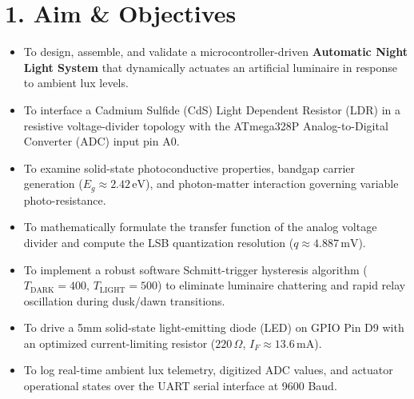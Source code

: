 \documentclass[10pt,a4paper]{article}
\begin{document}
\section*{1. Aim \& Objectives}
\begin{itemize}[noitemsep]
    \item To design, assemble, and validate a microcontroller-driven \textbf{Automatic Night Light System} that dynamically actuates an artificial luminaire in response to ambient lux levels.
    \item To interface a Cadmium Sulfide (CdS) Light Dependent Resistor (LDR) in a resistive voltage-divider topology with the ATmega328P Analog-to-Digital Converter (ADC) input pin A0.
    \item To examine solid-state photoconductive properties, bandgap carrier generation ($E_g \approx 2.42\,\text{eV}$), and photon-matter interaction governing variable photo-resistance.
    \item To mathematically formulate the transfer function of the analog voltage divider and compute the LSB quantization resolution ($q \approx 4.887\,\text{mV}$).
    \item To implement a robust software Schmitt-trigger hysteresis algorithm ($T_{\text{DARK}} = 400$, $T_{\text{LIGHT}} = 500$) to eliminate luminaire chattering and rapid relay oscillation during dusk/dawn transitions.
    \item To drive a 5mm solid-state light-emitting diode (LED) on GPIO Pin D9 with an optimized current-limiting resistor ($220\,\Omega$, $I_F \approx 13.6\,\text{mA}$).
    \item To log real-time ambient lux telemetry, digitized ADC values, and actuator operational states over the UART serial interface at 9600 Baud.
\end{itemize}
\end{document}
